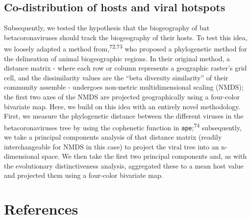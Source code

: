 \documentclass[10pt,oneside]{article}
\begin{document}
\hypertarget{co-distribution-of-hosts-and-viral-hotspots}{%
\subsection{Co-distribution of hosts and viral
hotspots}\label{co-distribution-of-hosts-and-viral-hotspots}}

Subsequently, we tested the hypothesis that the biogeography of bat
betacoronaviruses should track the biogeography of their hosts. To test
this idea, we loosely adapted a method from,\textsuperscript{72,73} who
proposed a phylogenetic method for the delineation of animal
biogeographic regions. In their original method, a distance matrix -
where each row or column represents a geographic raster's grid cell, and
the dissimilarity values are the ``beta diversity similarity'' of their
community assemble - undergoes non-metric multidimensional scaling
(NMDS); the first two axes of the NMDS are projected geographically
using a four-color bivariate map. Here, we build on this idea with an
entirely novel methodology. First, we measure the phylogenetic distance
between the different viruses in the betacoronaviruses tree by using the
cophenetic function in \texttt{ape};\textsuperscript{74} subsequently,
we take a principal components analysis of that distance matrix (readily
interchangeable for NMDS in this case) to project the viral tree into an
n-dimensional space. We then take the first two principal components
and, as with the evolutionary distinctiveness analysis, aggregated these
to a mean host value and projected them using a four-color bivariate
map.

\hypertarget{references}{%
\section*{References}\label{references}}
\end{document}
